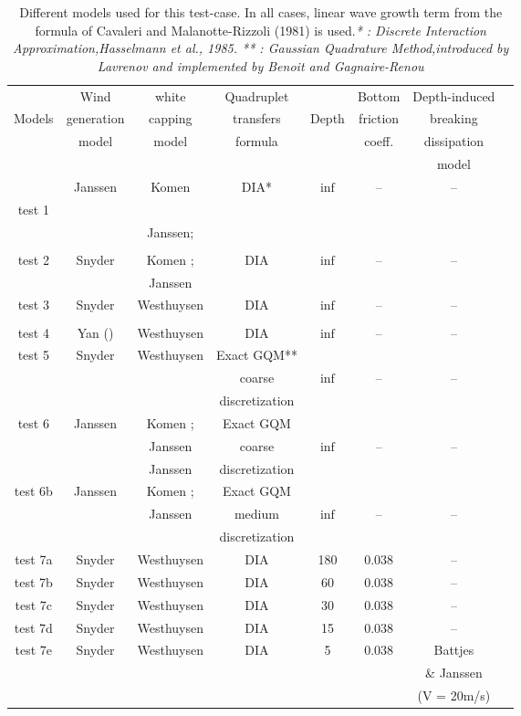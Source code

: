 \begin{table}
\begin{tabular}{|c|c|c|c|c|c|c|c|}
\hline
       & Wind        & white     & Quadruplet &         & Bottom  & Depth-induced  \\
Models & generation  &  capping  & transfers  &  Depth &  friction & breaking \\
       &  model      &  model    &   formula &         &  coeff. &  dissipation \\
       &        &      &    &         &   &   model\\\hline
  & Janssen & Komen& DIA* & $\inf$ & -- & --\\
test 1 & \cite{Janssen1989} &\cite{Komen1984}& &  &  &\\
 &  \cite{Janssen1991} & Janssen;  & &  &  & \\
&   &  \cite{Janssen1991}  & &  &  & \\
\hline
test 2  & Snyder  & Komen ;  & DIA & $\inf$ & --& --\\
 &  \cite{Snyder1981}& Janssen & &  & &\\
\hline
test 3 & Snyder & Westhuysen  & DIA & $\inf$ & --& -- \\
 &  &  \cite{Westhuys2007} &  & & &  \\
\hline
test 4 & Yan (\cite{Yan1987}) & Westhuysen & DIA & $\inf$ & --& -- \\
\hline
test 5 & Snyder & Westhuysen & Exact GQM** & & &  \\
 &  &  &  coarse  & $\inf$ & --& --\\
 &  &  &  discretization & & & \\ \hline
 test 6 & Janssen &Komen ;  & Exact GQM  & & &\\
 &  & Janssen  &  coarse & $\inf$ & -- & -- \\
 &  & Janssen  &  discretization & & & \\ \hline
 test 6b & Janssen & Komen ;& Exact GQM &  & & \\
  &  & Janssen   &  medium  &$\inf$ & -- & --\\
  &  &    &  discretization & & & \\ \hline
test 7a & Snyder & Westhuysen & DIA & 180 & 0.038 & -- \\
 test 7b & Snyder & Westhuysen & DIA & 60 & 0.038& -- \\
 test 7c & Snyder & Westhuysen & DIA & 30 & 0.038& -- \\
  test 7d & Snyder & Westhuysen& DIA & 15 & 0.038& -- \\
   test 7e & Snyder & Westhuysen& DIA & 5 & 0.038& Battjes  \\
    &  & &  & & &\& Janssen \\
    &  & &  & & &(V = 20m/s) \\ \hline
 \end{tabular}
 \caption{Different models used for this test-case. In all cases, linear wave growth term from the formula of Cavaleri and
Malanotte-Rizzoli (1981) is used.\textit{* : Discrete Interaction Approximation,Hasselmann et al., 1985. ** : Gaussian Quadrature Method,introduced by Lavrenov
\cite{Lavrenov2001} and implemented by Benoit and Gagnaire-Renou \cite{Gagnaire2010}}}
\label{tabmodel}
\end{table}
